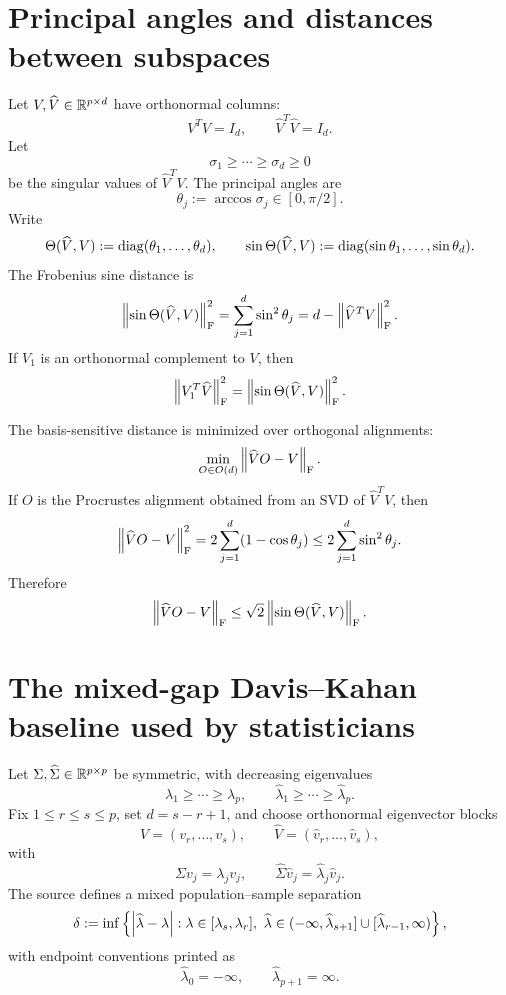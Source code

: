 \section{Principal angles and distances between subspaces}

Let $V,\widehat V\in\mathbb{R}^{p\times d}$ have orthonormal columns:
\[
  V^TV=I_d,
  \qquad
  \widehat V^T\widehat V=I_d.
\]
Let
\[
  \sigma_1\ge\cdots\ge\sigma_d\ge0
\]
be the singular values of $\widehat V^TV$. The principal angles are
\[
  \theta_j:=\arccos\sigma_j\in[0,\pi/2].
\]
Write
\[
  \Theta(\widehat V,V):=\operatorname{diag}(\theta_1,\dots,\theta_d),
  \qquad
  \sin\Theta(\widehat V,V):=\operatorname{diag}(\sin\theta_1,\dots,\sin\theta_d).
\]
The Frobenius sine distance is
\[
  \left\lVert \sin\Theta(\widehat V,V)\right\rVert_{\mathrm{F}}^2
  =\sum_{j=1}^d\sin^2\theta_j
  =d-\left\lVert \widehat V^TV\right\rVert_{\mathrm{F}}^2.
\]
If $V_1$ is an orthonormal complement to $V$, then
\[
  \left\lVert V_1^T\widehat V\right\rVert_{\mathrm{F}}^2
  =\left\lVert \sin\Theta(\widehat V,V)\right\rVert_{\mathrm{F}}^2.
\]

The basis-sensitive distance is minimized over orthogonal alignments:
\[
  \min_{O\in O(d)}\left\lVert \widehat VO-V\right\rVert_{\mathrm{F}}.
\]
If $O$ is the Procrustes alignment obtained from an SVD of $\widehat V^TV$, then
\[
  \left\lVert \widehat VO-V\right\rVert_{\mathrm{F}}^2
  =2\sum_{j=1}^d(1-\cos\theta_j)
  \le2\sum_{j=1}^d\sin^2\theta_j.
\]
Therefore
\[
  \left\lVert \widehat VO-V\right\rVert_{\mathrm{F}}
  \le\sqrt2\left\lVert \sin\Theta(\widehat V,V)\right\rVert_{\mathrm{F}}.
\]

\section{The mixed-gap Davis--Kahan baseline used by statisticians}


Let $\Sigma,\widehat\Sigma\in\mathbb{R}^{p\times p}$ be symmetric, with decreasing eigenvalues
\[
  \lambda_1\ge\cdots\ge\lambda_p,
  \qquad
  \widehat\lambda_1\ge\cdots\ge\widehat\lambda_p.
\]
Fix $1\le r\le s\le p$, set $d=s-r+1$, and choose orthonormal eigenvector blocks
\[
  V=(v_r,\dots,v_s),
  \qquad
  \widehat V=(\widehat v_r,\dots,\widehat v_s),
\]
with
\[
  \Sigma v_j=\lambda_jv_j,
  \qquad
  \widehat\Sigma\widehat v_j=\widehat\lambda_j\widehat v_j.
\]
The source defines a mixed population--sample separation
\[
  \delta
  :=\inf\left\{
      \abs{\widehat\lambda-\lambda}:
      \lambda\in[\lambda_s,\lambda_r],\ 
      \widehat\lambda\in
      (-\infty,\widehat\lambda_{s+1}]
      \cup[\widehat\lambda_{r-1},\infty)
    \right\},
\]
with endpoint conventions printed as
\[
  \widehat\lambda_0=-\infty,
  \qquad
  \widehat\lambda_{p+1}=\infty.
\]

